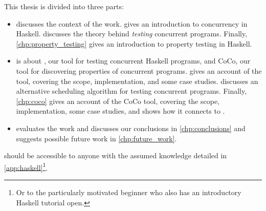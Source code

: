 This thesis is divided into three parts:

\begin{itemize}
\item {} discusses the context of the work.
   gives an introduction to concurrency
  in Haskell.   discusses the theory behind
  \emph{testing} concurrent programs.  Finally,
  \cref{chp:property_testing} gives an introduction to property
  testing in Haskell.

\item {} is about \dejafu{}, our tool for testing
  concurrent Haskell programs, and CoCo, our tool for discovering
  properties of concurrent programs.   gives an
  account of the \dejafu{} tool, covering the scope, implementation,
  and some case studies.   discusses an
  alternative scheduling algorithm for testing concurrent programs.
  Finally, \cref{chp:coco} gives an account of the CoCo tool, covering
  the scope, implementation, some case studies, and shows how it
  connects to \dejafu{}.

\item {} evaluates the work and discusses our conclusions
  in \cref{chp:conclusions} and suggests possible future work in
  \cref{chp:future_work}.
\end{itemize}

 should be
accessible to anyone with the assumed knowledge detailed in
\cref{app:haskell}\footnote{Or to the particularly motivated beginner
  who also has an introductory Haskell tutorial open.}.

